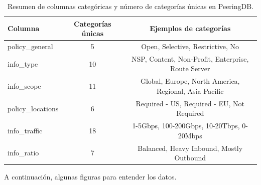 \begin{table}[H]
\centering
\caption{Resumen de columnas categóricas y número de categorías únicas en PeeringDB.}
\label{tab:categorias_categoricas}
\begin{tabular}{lcc}
\hline
\textbf{Columna} & \textbf{Categorías únicas} & \textbf{Ejemplos de categorías} \\
\hline
policy\_general & 5 & Open, Selective, Restrictive, No \\
info\_type & 10 & NSP, Content, Non-Profit, Enterprise, Route Server \\
info\_scope & 11 & Global, Europe, North America, Regional, Asia Pacific \\
policy\_locations & 6 & Required - US, Required - EU, Not Required \\
info\_traffic & 18 & 1-5Gbps, 100-200Gbps, 10-20Tbps, 0-20Mbps \\
info\_ratio & 7 & Balanced, Heavy Inbound, Mostly Outbound \\
\hline
\end{tabular}
\end{table}





A continuación, algunas figuras para entender los datos.\\





